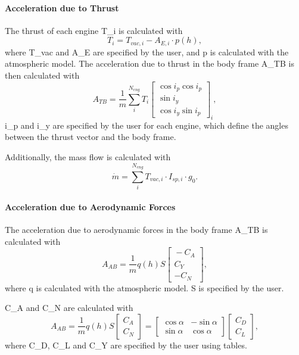 \paragraph{Acceleration due to Thrust}

The thrust of each engine \gls{T_i} is calculated with \[
  T_i = T_{vac, i} - A_{E,i} \cdot p(h),
\] where \gls{T_vac} and \gls{A_E} are specified by the user, and \gls{p} is calculated with the atmospheric model. The acceleration due to
thrust in the body frame
\gls{A_TB} is then calculated with \[
  A_{TB} = \frac1m\sum_{i}^{N_{eng}} T_i
  \begin{bmatrix}{}
    \cos i_p \cos i_p \\
    \sin i_y          \\
    \cos i_y \sin i_p
  \end{bmatrix}_i,
\] \gls{i_p} and \gls{i_y} are specified by the user for each engine, which define the angles
between the thrust vector and the body frame.

Additionally, the mass flow is calculated with \[
  \dot m = \sum_{i}^{N_{eng}} T_{vac, i}\cdot I_{sp, i}\cdot g_0 .
\]

\paragraph{Acceleration due to Aerodynamic Forces}

The acceleration due to aerodynamic forces in the body frame \gls{A_TB} is calculated with \[
  A_{AB} = \frac1mq(h)S
  \begin{bmatrix}{} -C_A \\
    C_Y     \\
    -C_N
  \end{bmatrix},
\] where \gls{q} is calculated with the atmospheric model. \gls{S} is specified by the user.

\gls{C_A} and \gls{C_N} are calculated with \[
  A_{AB} = \frac1mq(h)S
  \begin{bmatrix}{} C_A \\
    C_N
  \end{bmatrix} = \begin{bmatrix}{}
    \cos\alpha & -\sin\alpha \\
    \sin\alpha & \cos\alpha
  \end{bmatrix}\begin{bmatrix}{} C_D \\
    C_L
  \end{bmatrix},
\] where \gls{C_D}, \gls{C_L} and \gls{C_Y} are specified by the user using tables.

